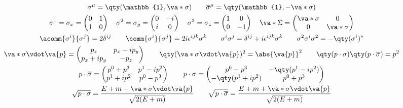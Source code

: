 \begin{gather*}
        \sigma^\mu=\qty(\mathbb{1},\va*{\sigma})
        \qquad
        \overline{\sigma}^\mu=\qty(\mathbb{1},-\va*{\sigma})
        \\
        \sigma^1 = \sigma_x = \begin{pmatrix}
                0 &1\\
                1 &0
        \end{pmatrix}
        \quad
        \sigma^2 = \sigma_y = \begin{pmatrix}
                0 &-i\\
                i &0
        \end{pmatrix}
        \quad
        \sigma^3 = \sigma_z = \begin{pmatrix}
                1 &0\\
                0 &-1
        \end{pmatrix}
        \quad
        \va*{\Sigma} = \begin{pmatrix}
                \va*{\sigma} &0\\
                0 &\va*{\sigma}\\
        \end{pmatrix}
        \\
        \acomm{\sigma^i}{\sigma^j} = 2\delta^{ij}
        \qquad
        \comm{\sigma^i}{\sigma^j} = 2i\epsilon^{ijk}\sigma^k
        \qquad
        \sigma^i\sigma^j = \delta^{ij} + i\epsilon^{ijk}\sigma^k
        \qquad
        \sigma^2\sigma^i\sigma^2 = -\qty(\sigma^i)^*
        \\
        \va*{\sigma}\vdot\va{p} = \begin{pmatrix}
                p_z      &p_x-ip_y \\
                p_x+ip_y &-p_z     \\
        \end{pmatrix}
        \qquad
        \qty(\va*{\sigma}\vdot\va{p})^2 = \abs{\va{p}}^2
        \qquad
        \qty(p\cdot\sigma)\qty(p\cdot\overline{\sigma}) = p^2
        \\
        p\cdot\overline{\sigma} = \begin{pmatrix}
                p^0+p^3  &p^1-ip^2 \\
                p^1+ip^2 &p^0-p^3  \\
        \end{pmatrix}
        \qquad
        p\cdot\sigma = \begin{pmatrix}
                p^0 - p^3       &-\qty(p^1-ip^2) \\
                -\qty(p^1+ip^2) &p^0+p^3         \\
        \end{pmatrix}
        \\
        \sqrt{p\cdot\sigma} = \frac{E + m - \va*{\sigma}\vdot\va{p}}{\sqrt{2(E+m)}}
        \qquad
        \sqrt{p\cdot\overline{\sigma}} = \frac{E + m + \va*{\sigma}\vdot\va{p}}{\sqrt{2(E+m)}}
\end{gather*}
